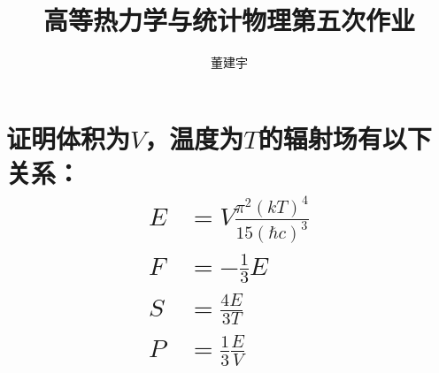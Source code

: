 \documentclass[reqno,a4paper,12pt]{amsart}
\title{高等热力学与统计物理第五次作业}
\author{董建宇}
\begin{document}
\maketitle

\titleformat{\section}[hang]{\small}{\thesection}{0.8em}{}{}
\titleformat{\subsection}[hang]{\small}{\thesubsection}{0.8em}{}{}

\section{证明体积为$V$，温度为$T$的辐射场有以下关系：
\begin{align*}
	E &= V\frac{\pi^2(kT)^4}{15(\hbar c)^3} \\
	F &= -\frac{1}{3}E \\
	S &= \frac{4E}{3T} \\
	P &= \frac{1}{3}\frac{E}{V}
\end{align*}}
\end{document}
